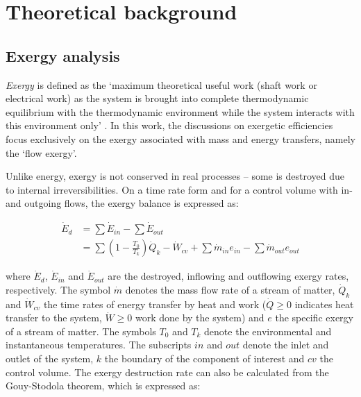 

\section{Theoretical background}
\label{sec:background}

\subsection{Exergy analysis}
\label{subsec:exergy_analysis}

\emph{Exergy} is defined as the `maximum theoretical useful work (shaft work or electrical work) as the system is brought into complete thermodynamic equilibrium with the thermodynamic environment while the system interacts with this environment only' \cite{BejanAdrian;TsatsaronisGeorge;Moran1996,Moran1998,Thermoeconomics2001}. In this work, the discussions on exergetic efficiencies focus exclusively on the exergy associated with mass and energy transfers, namely the `flow exergy'. 

Unlike energy, exergy is not conserved in real processes -- some is destroyed due to internal irreversibilities. On a time rate form and for a control volume with in- and outgoing flows, the exergy balance is expressed as: 

	\begin{align}
		\dot{E}_d&=\sum \dot{E}_{in} - \sum \dot{E}_{out} \nonumber\\
					  &=\sum \left (1-\frac{T_0}{T_k} \right ) \dot{Q}_k-\dot{W}_{cv}+\sum \dot{m}_{in} e_{in} - \sum \dot{m}_{out} e_{out}
	\end{align}

where $\dot{E}_d$, $\dot{E}_{in}$ and $\dot{E}_{out}$ are the destroyed, inflowing and outflowing exergy rates, respectively. The symbol $\dot{m}$ denotes the mass flow rate of a stream of matter, $\dot{Q}_k$ and $\dot{W}_{cv}$ the time rates of energy transfer by heat and work ($\dot{Q}\geq0$ indicates heat transfer to the system, $\dot{W}\geq0$ work done by the system) and $e$ the specific exergy of a stream of matter. The symbols $T_0$ and $T_k$ denote the environmental and instantaneous temperatures. The subscripts $in$ and $out$ denote the inlet and outlet of the system, $k$ the boundary of the component of interest and $cv$ the control volume. The exergy destruction rate can also be calculated from the Gouy-Stodola theorem, which is expressed as:

	
